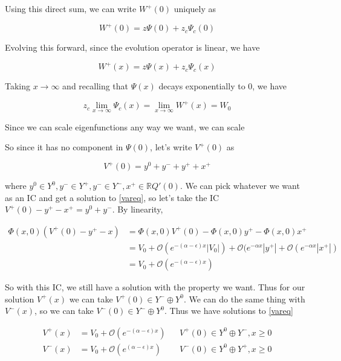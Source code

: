 \documentclass[12pt]{article}
\def\R{{\mathbb R}}
\begin{document}
Using this direct sum, we can write $W^+(0)$ uniquely as

\[
W^+(0) = z \Psi(0) + z_c \Psi_c(0)
\]

Evolving this forward, since the evolution operator is linear, we have 

\[
W^+(x) = z \Psi(x) + z_c \Psi_c(x)
\]

Taking $x \rightarrow \infty$ and recalling that $\Psi(x)$ decays exponentially to 0, we have

\[
z_c \lim_{x \rightarrow \infty} \Psi_c(x) = \lim_{x \rightarrow \infty} W^+(x) = W_0
\]

Since we can scale eigenfunctions any way we want, we can scale 










So since it has no component in $\Psi(0)$, let's write $V^+(0)$ as

\[
V^+(0) = y^0 + y^- + y^+ + x^+
\]

where $y^0 \in Y^0, y^- \in Y^+, y^- \in Y^-, x^+ \in \R Q'(0)$. We can pick whatever we want as an IC and get a solution to \eqref{vareq}, so let's take the IC $V^+(0) - y^+ - x^+ = y^0 + y^-$. By linearity,

\begin{align*}
\Phi(x, 0)( V^+(0) - y^+ - x ) &= \Phi(x, 0)V^+(0) - \Phi(x, 0) y^+ - \Phi(x, 0) x^+ \\
&= V_0 + \mathcal{O}(e^{-(\alpha - \epsilon)x}|V_0|) + \mathcal{O}(e^{-\alpha x}|y^+| + 
\mathcal{O}(e^{-\alpha x}|x^+|) \\
&= V_0 + \mathcal{O}(e^{-(\alpha - \epsilon)x})
\end{align*}

So with this IC, we still have a solution with the property we want. Thus for our solution $V^+(x)$ we can take $V^+(0) \in Y^- \oplus Y^0$. We can do the same thing with $V^-(x)$, so we can take $V^-(0) \in Y^- \oplus Y^0$. Thus we have solutions to \eqref{vareq}

\begin{align*}
V^+(x) &= V_0 + \mathcal{O}(e^{-(\alpha - \epsilon)x}) && V^+(0) \in Y^0 \oplus Y^-, x \geq 0 \\
V^-(x) &= V_0 + \mathcal{O}(e^{(\alpha - \epsilon)x}) && V^-(0) \in Y^0 \oplus Y^+, x \geq 0
\end{align*}
\end{document}
